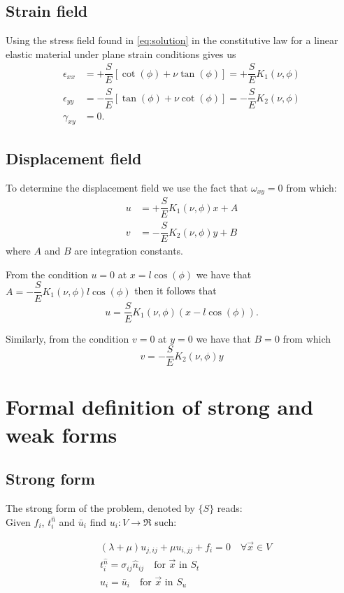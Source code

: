 \subsection*{Strain field}
Using the stress field found in \cref{eq:solution} in the constitutive law for a linear elastic material under plane strain conditions gives us
\begin{equation}
\begin{aligned}
\epsilon_{xx}& = +\dfrac{S}{E}\left[\cot(\phi)+\nu \tan(\phi)\right] = +\dfrac{S}{E}K_{1}(\nu , \phi)\\
\epsilon_{yy}& = -\dfrac{S}{E}\left[\tan(\phi)+\nu \cot(\phi)\right] = -\dfrac{S}{E}K_{2}(\nu , \phi)\\
\gamma_{xy}& = 0.
\end{aligned}
\label{eq:strain part}
\end{equation}

\subsection*{Displacement field}

To determine the displacement field we use the fact that $\omega_{xy}=0$ from which:
\begin{align*}
u &= +\dfrac{S}{E} K_{1}(\nu , \phi)x + A\\
v &= -\dfrac{S}{E} K_{2}(\nu , \phi)y + B
\end{align*}
where $A$ and $B$ are integration constants.

From the condition $u=0$ at $x=l\cos(\phi)$ we have that $A=-\dfrac{S}{E} K_{1}(\nu , \phi)l\cos(\phi)$ then it follows that
\[u=\dfrac{S}{E} K_{1}(\nu , \phi)(x-l\cos(\phi)).\]

Similarly, from the condition $v=0$ at $y=0$ we have that $B=0$ from which
\[v=-\dfrac{S}{E} K_{2}(\nu , \phi)y\]


\section{Formal definition of strong and weak forms}
\subsection*{Strong form}
The strong form of the problem, denoted by $\{ S \}$ reads:\\

Given $f_i$, $t_i^{\hat n}$ and ${\bar u_i}$ find ${u_i}:V \to \Re$ such:

\begin{equation} \label{eq:navier_2}
\begin{split}
&\left( {\lambda  + \mu } \right){u_{j,ij}} + \mu {u_{i,jj}} + {f_i} = 0 \quad \text{$\forall \vec x \in V$} \\
&t_i^{\hat n} = {\sigma _{ij}}{\hat n_{ij}} \quad \text{for $\vec x$ in $S_t$}\\
& {u_i} = {{\bar u}_i} \quad \text{for $\vec x$ in $S_u$}
\end{split}
\end{equation}

